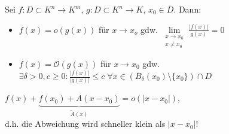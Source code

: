 \begin{*definition}
	Sei $f:D\subset K^n \to K^m$, $g:D\subset K^n \to K$, $x_0 \in \overline{D}$. Dann:
	\begin{itemize}
		\item $f(x) = o(g(x))$ für $x\to x_o$ gdw. $\lim\limits_{\substack{x\to x_0 \\ x\neq x_0}} \frac{\vert f(x) \vert}{g(x)} = 0$
		\item $f(x) = \mathcal{O}(g(x))$ für $x\to x_0$ gdw. $\exists \delta > 0, c \ge 0: \frac{\vert f(x) \vert}{\vert g(x) \vert} \le c \;\forall x\in \left( B_\delta(x_0)\setminus \{ x_0\}\right) \cap D$
	\end{itemize}
\end{*definition}

\begin{*definition}[Anschmiegen]
	$f(x) + \underbrace{f(x_0) + A(x-x_0)}_{\tilde{A}(x)} = o(\vert x-x_0\vert)$, \\
	d.h. die Abweichung wird schneller klein als $\vert x-x_0\vert$!
\end{*definition}

